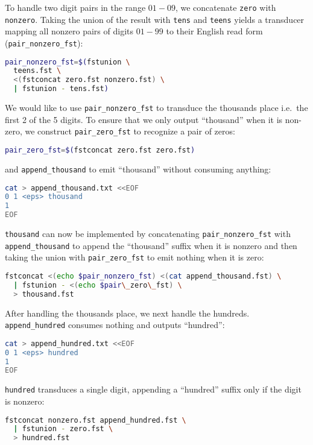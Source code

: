 \documentclass[a4paper,oneside,reqno]{amsart}
\begin{document}
\begin{enumerate}[label=\arabic*.]
    To handle two digit pairs in the range $01-09$, we concatenate \texttt{zero}
    with \texttt{nonzero}. Taking the union of the result with \texttt{tens}
    and \texttt{teens} yields a transducer mapping all nonzero pairs of digits $01-99$
    to their English read form (\texttt{pair\_nonzero\_fst}):
    \begin{lstlisting}[language=bash]
pair_nonzero_fst=$(fstunion \
  teens.fst \
  <(fstconcat zero.fst nonzero.fst) \
  | fstunion - tens.fst)
    \end{lstlisting}

    We would like to use \texttt{pair\_nonzero\_fst} to transduce the thousands
    place i.e.\ the first 2 of the 5 digits. To ensure that we only output
    ``thousand'' when it is non-zero, we construct \texttt{pair\_zero\_fst} to
    recognize a pair of zeros:
    \begin{lstlisting}[language=bash]
pair_zero_fst=$(fstconcat zero.fst zero.fst)
    \end{lstlisting}
    and \texttt{append\_thousand} to emit ``thousand'' without consuming anything:
    \begin{lstlisting}[language=bash]
cat > append_thousand.txt <<EOF
0 1 <eps> thousand
1
EOF
    \end{lstlisting}
    \texttt{thousand} can now be implemented by concatenating
    \texttt{pair\_nonzero\_fst} with \texttt{append\_thousand}
    to append the ``thousand'' suffix when it is nonzero and
    then taking the union with \texttt{pair\_zero\_fst} to emit nothing
    when it is zero:
    \begin{lstlisting}[language=bash]
fstconcat <(echo $pair_nonzero_fst) <(cat append_thousand.fst) \
  | fstunion - <(echo $pair\_zero\_fst) \
  > thousand.fst
    \end{lstlisting}

    After handling the thousands place, we next handle the hundreds. \texttt{append\_hundred}
    consumes nothing and outputs ``hundred'':
    \begin{lstlisting}[language=bash]
cat > append_hundred.txt <<EOF
0 1 <eps> hundred
1
EOF
    \end{lstlisting}
    \texttt{hundred} transduces a single digit, appending a ``hundred'' suffix only if
    the digit is nonzero:
    \begin{lstlisting}[language=bash]
fstconcat nonzero.fst append_hundred.fst \
  | fstunion - zero.fst \
  > hundred.fst
    \end{lstlisting}


\end{enumerate}
\end{document}
